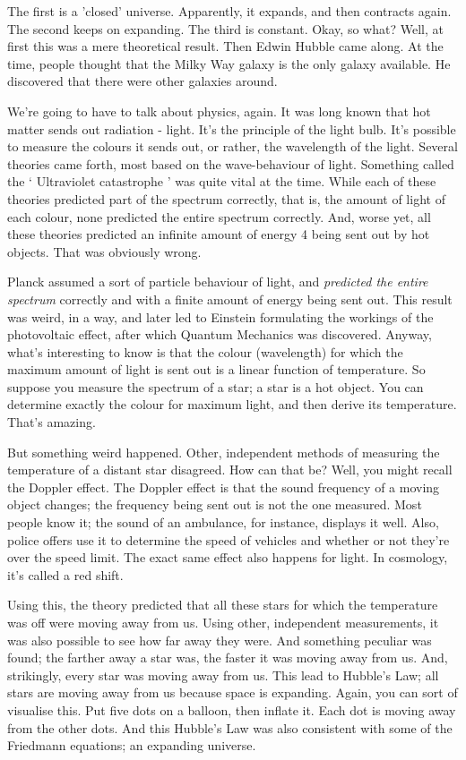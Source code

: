 \begin{multicols}{2}
The first is a 'closed' universe. Apparently, it expands, and then contracts again. The second keeps on expanding. The third is constant. Okay, so what? Well, at first this was a mere theoretical result. Then Edwin Hubble came along. At the time, people thought that the Milky Way galaxy is the only galaxy available. He discovered that there were other galaxies around.

We're going to have to talk about physics, again. It was long known that hot matter sends out radiation - light. It's the principle of the light bulb. It's possible to measure the colours it sends out, or rather, the wavelength of the light. Several theories came forth, most based on the wave-behaviour of light. Something called the ‘ Ultraviolet catastrophe ’ was quite vital at the time. While each of these theories predicted part of the spectrum correctly, that is, the amount of light of each colour, none predicted the entire spectrum correctly. And, worse yet, all these theories predicted an infinite amount of energy 4 being sent out by hot objects. That was obviously wrong.

Planck assumed a sort of particle behaviour of light, and \emph{predicted the entire spectrum} correctly and with a finite amount of energy being sent out. This result was weird, in a way, and later led to Einstein formulating the workings of the photovoltaic effect, after which Quantum Mechanics was discovered. Anyway, what's interesting to know is that the colour (wavelength) for which the maximum amount of light is sent out is a linear function of temperature. So suppose you measure the spectrum of a star; a star is a hot object. You can determine exactly the colour for maximum light, and then derive its temperature. That's amazing.

But something weird happened. Other, independent methods of measuring the temperature of a distant star disagreed. How can that be? Well, you might recall the Doppler effect. The Doppler effect is that the sound frequency of a moving object changes; the frequency being sent out is not the one measured. Most people know it; the sound of an ambulance, for instance, displays it well. Also, police offers use it to determine the speed of vehicles and whether or not they're over the speed limit. The exact same effect also happens for light. In cosmology, it's called a red shift.

Using this, the theory predicted that all these stars for which the temperature was off were moving away from us. Using other, independent measurements, it was also possible to see how far away they were. And something peculiar was found; the farther away a star was, the faster it was moving away from us. And, strikingly, every star was moving away from us. This lead to Hubble's Law; all stars are moving away from us because space is expanding. Again, you can sort of visualise this. Put five dots on a balloon, then inflate it. Each dot is moving away from the other dots. And this Hubble's Law was also consistent with some of the Friedmann equations; an expanding universe.


\end{multicols}

